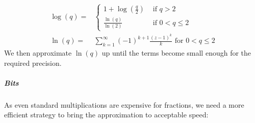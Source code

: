 \documentclass{article}
\begin{document}
                    \begin{align*}
                        \log(q) ={}& \begin{cases}
                            1 + \log(\frac{q}{2}) & \text{ if } q > 2\\ 
                            \frac{\ln(q)}{\ln(2)} & \text{ if } 0 < q \leq 2
                        \end{cases}\\
                        \ln(q) ={}& \sum_{k=1}^{\infty} (-1)^{k+1} \frac{(z-1)^k}{k} \text{ for } 0 < q \leq 2
                    \end{align*}
                    We then approximate $\ln(q)$ up until the terms become small enough for the required precision.

                \subparagraph{Bits}
                    As even standard multiplications are expensive for fractions, we need a more efficient strategy to bring the approximation to acceptable speed:
\end{document}

